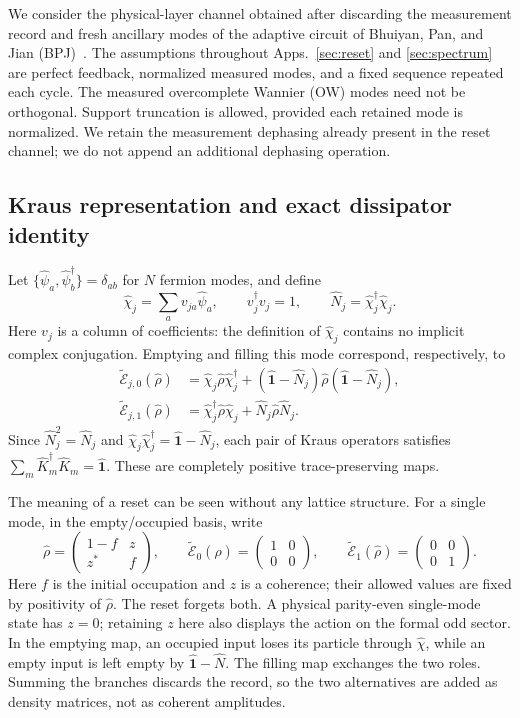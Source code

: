 \documentclass[aps,prb,onecolumn,nofootinbib,superscriptaddress,floatfix]{revtex4-2}
\newcommand{\Id}{\hat{\mathbf 1}}
\newcommand{\E}{\widetilde{\mathcal E}}
\begin{document}
We consider the physical-layer channel obtained after discarding the
measurement record and fresh ancillary modes of the adaptive circuit
of Bhuiyan, Pan, and Jian (BPJ)~\cite{BPJ}. The assumptions throughout
Apps.~\ref{sec:reset} and \ref{sec:spectrum} are perfect feedback,
normalized measured modes, and a fixed sequence repeated each cycle.
The measured overcomplete Wannier (OW) modes need not be orthogonal.
Support truncation is allowed, provided each retained mode is
normalized. We retain the measurement dephasing already present in
the reset channel; we do not append an additional dephasing operation.

\subsection{Kraus representation and exact dissipator identity}
Let $\{\hat\psi_a,\hat\psi_b^\dagger\}=\delta_{ab}$ for $N$ fermion
modes, and define
\begin{equation}
 \hat\chi_j=\sum_a v_{ja}\hat\psi_a,\qquad
 v_j^\dagger v_j=1,\qquad \hat N_j=\hat\chi_j^\dagger\hat\chi_j.
 \label{eq:mode}
\end{equation}
Here $v_j$ is a column of coefficients: the definition of
$\hat\chi_j$ contains no implicit complex conjugation. Emptying and
filling this mode correspond, respectively, to
\begin{align}
 \E_{j,0}(\hat\rho)&=\hat\chi_j\hat\rho\hat\chi_j^\dagger
 +(\Id-\hat N_j)\hat\rho(\Id-\hat N_j),\nonumber\\
 \E_{j,1}(\hat\rho)&=\hat\chi_j^\dagger\hat\rho\hat\chi_j
 +\hat N_j\hat\rho\hat N_j. \label{eq:kraus}
\end{align}
Since $\hat N_j^2=\hat N_j$ and
$\hat\chi_j\hat\chi_j^\dagger=\Id-\hat N_j$, each pair of Kraus
operators satisfies $\sum_m\hat K_m^\dagger\hat K_m=\Id$.
These are completely positive trace-preserving maps.

The meaning of a reset can be seen without any lattice structure.
For a single mode, in the empty/occupied basis, write
\begin{equation}
 \hat\rho=
 \begin{pmatrix}1-f&z\\z^*&f\end{pmatrix},
 \qquad
 \E_0(\hat\rho)=
 \begin{pmatrix}1&0\\0&0\end{pmatrix},
 \qquad
 \E_1(\hat\rho)=
 \begin{pmatrix}0&0\\0&1\end{pmatrix}.
 \label{eq:one_mode_reset}
\end{equation}
Here $f$ is the initial occupation and $z$ is a coherence; their
allowed values are fixed by positivity of $\hat\rho$. The reset
forgets both. A physical parity-even single-mode state has $z=0$;
retaining $z$ here also displays the action on the formal odd sector.
In the emptying map, an occupied input loses its
particle through $\hat\chi$, while an empty input is left empty by
$\Id-\hat N$. The filling map exchanges the two roles. Summing
the branches discards the record, so the two alternatives are added
as density matrices, not as coherent amplitudes.
\end{document}

